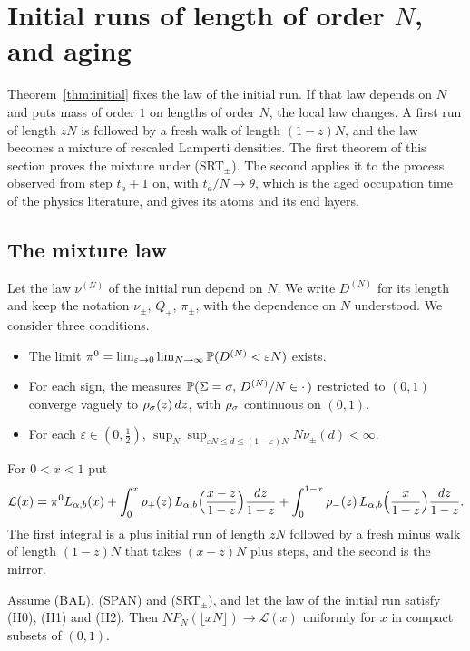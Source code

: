 \section{Initial runs of length of order $N$, and aging}\label{sec:aging}

Theorem~\ref{thm:initial} fixes the law of the initial run. If that law depends on $N$
and puts mass of order $1$ on lengths of order $N$, the local law changes. A first run
of length $zN$ is followed by a fresh walk of length $(1-z)N$, and the law becomes a
mixture of rescaled Lamperti densities. The first theorem of this section proves the
mixture under (SRT$_\pm$). The second applies it to the process observed from step
$t_a+1$ on, with $t_a/N\to\theta$, which is the aged occupation time of the physics
literature, and gives its atoms and its end layers.

\subsection{The mixture law}\label{sec:mixture}

Let the law $\nu^{(N)}$ of the initial run depend on $N$. We write $D^{(N)}$ for its
length and keep the notation $\nu_\pm$, $Q_\pm$, $\pi_\pm$, with the dependence on $N$
understood. We consider three conditions.
\begin{itemize}[leftmargin=4em,labelsep=0.8em]
\item[(H0)] The limit $\pi^0=\lim_{\varepsilon\to0}\lim_{N\to\infty}\mathbb{P}(D^{(N)}<\varepsilon N)$ exists.
\item[(H1)] For each sign, the measures $\mathbb{P}(\Sigma=\sigma,\,D^{(N)}/N\in\cdot\,)$ restricted to
$(0,1)$ converge vaguely to $\rho_\sigma(z)\,dz$, with $\rho_\sigma$ continuous on $(0,1)$.
\item[(H2)] For each $\varepsilon\in(0,\frac12)$,
$\sup_N\sup_{\varepsilon N\le d\le(1-\varepsilon)N}N\nu_\pm(d)<\infty$.
\end{itemize}
For $0<x<1$ put
\begin{equation}\label{eq:mixture}
 \mathcal L(x)=\pi^0L_{\alpha,b}(x)+\int_0^x\rho_{+}(z)\,L_{\alpha,b}\Bigl(\frac{x-z}{1-z}\Bigr)\frac{dz}{1-z}
 +\int_0^{1-x}\rho_{-}(z)\,L_{\alpha,b}\Bigl(\frac x{1-z}\Bigr)\frac{dz}{1-z}.
\end{equation}
The first integral is a plus initial run of length $zN$ followed by a fresh minus walk of
length $(1-z)N$ that takes $(x-z)N$ plus steps, and the second is the mirror.

\begin{introtheorem}\label{thm:mixture}
Assume (BAL), (SPAN) and (SRT$_\pm$), and let the law of the initial run satisfy (H0),
(H1) and (H2). Then $NP_N(\lfloor xN\rfloor)\to\mathcal L(x)$ uniformly for $x$ in compact
subsets of $(0,1)$.
\end{introtheorem}

